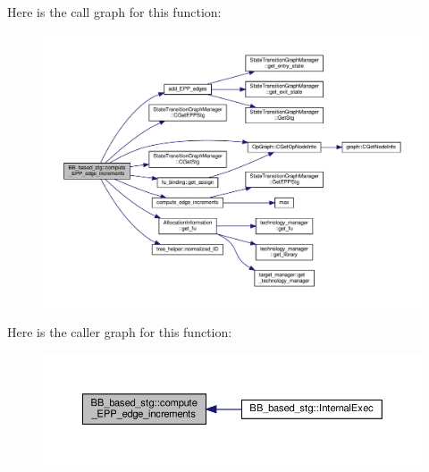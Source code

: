 Here is the call graph for this function\+:
\nopagebreak
\begin{figure}[H]
\begin{center}
\leavevmode
\includegraphics[width=350pt]{dd/d84/classBB__based__stg_a6d31e33f5c5a4cbd01e673e4c81310da_cgraph}
\end{center}
\end{figure}
Here is the caller graph for this function\+:
\nopagebreak
\begin{figure}[H]
\begin{center}
\leavevmode
\includegraphics[width=350pt]{dd/d84/classBB__based__stg_a6d31e33f5c5a4cbd01e673e4c81310da_icgraph}
\end{center}
\end{figure}
\mbox{\label{classBB__based__stg_af5a6daf4d51de5aa9b2aa18eba16c5d1}} 
